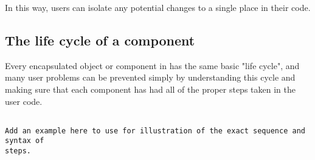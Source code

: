In this way, users can isolate any
potential changes to a single 
place in their code.


\subsection{The life cycle of a component}

Every encapsulated object or component in \hypre{} has the same basic "life
cycle", and many user 
problems can be prevented simply by understanding this cycle and making sure
that each component has 
had all of the proper steps taken in the user code.

\begin{display}
\begin{verbatim}

Add an example here to use for illustration of the exact sequence and syntax of
steps.

\end{verbatim}
\end{display}

